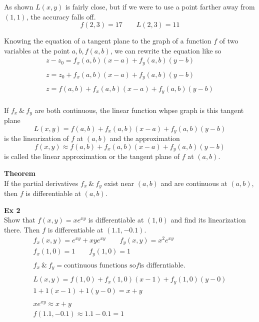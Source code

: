 \documentclass{article}
\begin{document}
  As shown $ L(x,y) $ is fairly close, but if we were to use a point farther away from $ (1,1) $, the accuracy falls off.
  \[
    f(2,3)=17 \qquad L(2,3)=11
  \]
  
  Knowing the equation of a tangent plane to the graph of a function $ f $ of two variables at the point $ a,b,f(a,b)$, we can rewrite the equation like so  
  \[
    \begin{gathered}
     z-z_{0}=f_{x}(a,b  )(x-a)+f_{y}(a,b)(y-b)\\
     ~\\
     z=z_{0}+f_{x}(a,b  )(x-a)+f_{y}(a,b  )(y-b)\\
     ~\\
     z=f(a,b) +f_{x}(a,b  )(x-a)+f_{y}(a,b  )(y-b)\\
    \end{gathered}
  \]

  If $ f_{x} ~\&~ f_{y}$ are both continuous, the linear function whpse graph is this tangent plane
  \[
    L(x,y)=f(a,b)+f_{x}(a,b)(x-a)+f_{y}(a,b)(y-b)  
  \]
  is the linearization of $ f $ at $ (a,b) $ and the approximation
  \[
  f(x,y)\approx f(a,b)+f_{x}(a,b)(x-a)+f_{y}(a,b)(y-b)
  \]
  is called the linear approximation or the tangent plane of $ f $ at $ (a,b) $.

  \textbf{Theorem}\\
  If the partial derivatives $ f_{x} ~\&~ f_{y} $ exist near $ (a,b) $ and are continuous at $ (a,b) $, then $ f $ is differentiable at $ (a,b) $.     

  \textbf{Ex 2}\\
  Show that $ f(x,y)=xe^{xy}  $ is differentiable at $ (1,0) $ and find its linearization there. Then $ f $ is differentiable at $ (1.1,-0.1)$.
  \[
    \begin{gathered}
      f_{x}(x,y)=e^{xy}+xye^{xy} \qquad f_{y}(x,y)=x^{2}e^{xy}\\
      f_{x}(1,0)=1 \qquad f_{y}(1,0) = 1\\
      ~\\
      f_{x} ~\&~ f_{y}=\text{continuous functions so} f \text{is differntiable.}\\
      ~\\
      L(x,y)=f(1,0)+f_{x}(1,0)(x-1)+f_{y}(1,0)(y-0)\\
      1+1(x-1) + 1(y-0)=x+y\\
      ~\\
      \boxed{xe^{xy}\approx x+y}\\
    f(1.1,-0.1) \approx 1.1 - 0.1 = \boxed{1} 
    \end{gathered}
  \]
\end{document}
